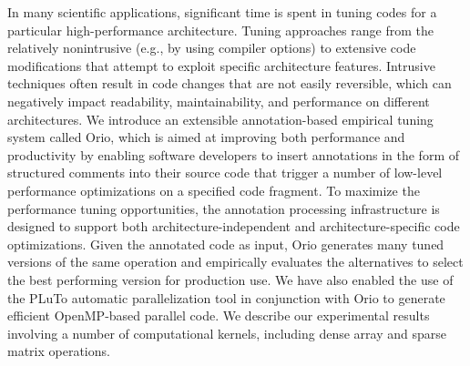 In many scientific applications, significant time is spent in tuning codes for a particular high-performance architecture. Tuning approaches range from the relatively nonintrusive (e.g., by using compiler options) to extensive code modifications that attempt to exploit specific architecture features. Intrusive techniques often result in code changes that are not easily reversible, which can negatively impact readability, maintainability, and performance on different architectures. We introduce an extensible annotation-based empirical tuning system called Orio, which is aimed at improving both performance and productivity by enabling software developers to insert annotations in the form of structured comments into their source code that trigger a number of low-level performance optimizations on a specified code fragment.  To maximize the performance tuning opportunities, the annotation processing infrastructure is designed to support both architecture-independent and architecture-specific code optimizations. Given the annotated code as input, Orio generates many tuned versions of the same operation and empirically evaluates the alternatives to select the best performing version for production use. We have also enabled the use of the PLuTo automatic parallelization tool in conjunction with Orio to generate efficient OpenMP-based parallel code. We describe our experimental results involving a number of computational kernels, including dense array and sparse matrix operations.
